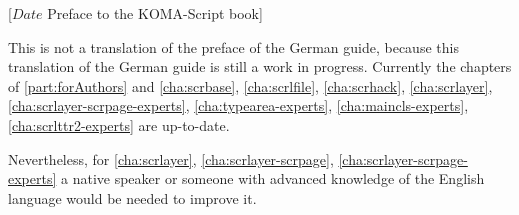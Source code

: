 %
%
%
%
%
%
%
%
%

                 [$Date$
                  Preface to the KOMA-Script book]



This is not a translation of the preface of the German \KOMAScript{} guide,
because this translation of the German \KOMAScript{} guide is still a work in
progress. Currently the chapters of \autoref{part:forAuthors} and
\autoref{cha:scrbase}, \autoref{cha:scrlfile}, \autoref{cha:scrhack},
\autoref{cha:scrlayer}, \autoref{cha:scrlayer-scrpage-experts},
\autoref{cha:typearea-experts}, \autoref{cha:maincls-experts},
\autoref{cha:scrlttr2-experts} are up-to-date.

Nevertheless, for \autoref{cha:scrlayer}, \autoref{cha:scrlayer-scrpage},
\autoref{cha:scrlayer-scrpage-experts} a native speaker or someone with
advanced knowledge of the English language would be needed to improve it.

